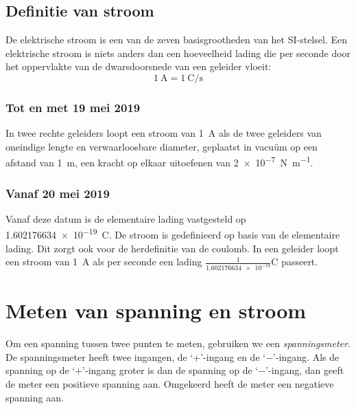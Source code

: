 \subsection{Definitie van stroom}
De elektrische stroom is een van de zeven basisgrootheden van het SI-stelsel. Een elektrische stroom is niets anders dan een hoeveelheid lading die per seconde door het oppervlakte van de dwarsdoorsnede van een geleider vloeit:
%
\begin{equation}
\SI{1}{\ampere} = \SI[per-mode=fraction]{1}{\coulomb\per\second}
\end{equation} 

\subsubsection*{Tot en met 19 mei 2019}
In twee rechte geleiders loopt een stroom van \SI{1}{\ampere} als de twee geleiders van oneindige lengte en verwaarloosbare diameter, geplaatst in vacuüm op een afstand van \SI{1}{\meter}, een kracht op elkaar uitoefenen van \SI[per-mode=symbol]{2e-7}{\newton\per\meter}.

\subsubsection*{Vanaf 20 mei 2019}
Vanaf deze datum is de elementaire lading vastgesteld op \SI{1.602176634e-19}{\coulomb}. De stroom is gedefinieerd op basis van de elementaire lading. Dit zorgt ook voor de herdefinitie van de coulomb. In een geleider loopt een stroom van \SI{1}{\ampere} als per seconde een lading $\frac{1}{\num{1.602176634e-19}}\si{\coulomb}$ passeert.

\section{Meten van spanning en stroom}
Om een spanning tussen twee punten te meten, gebruiken we een \textsl{spanningsmeter}. De spanningsmeter heeft twee ingangen, de `+'-ingang en de `$-$'-ingang. Als de spanning op de `+'-ingang groter is dan de spanning op de `$-$'-ingang, dan geeft de meter een positieve spanning aan. Omgekeerd heeft de meter een negatieve spanning aan.

